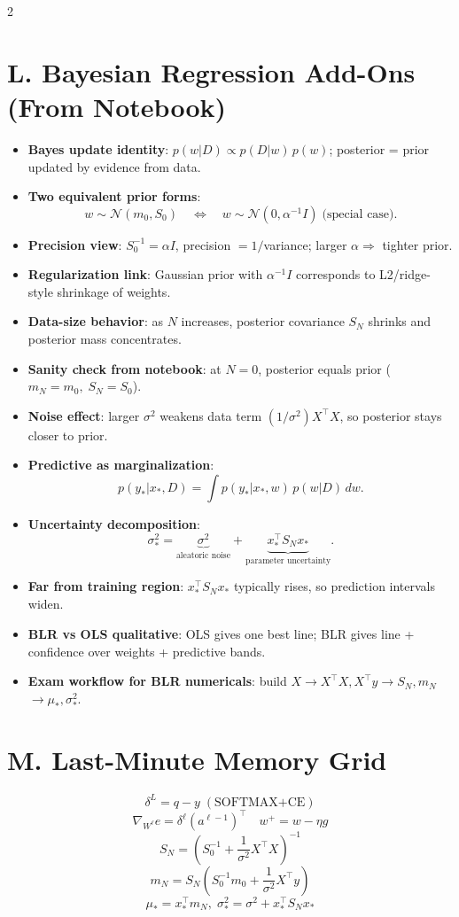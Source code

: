 \documentclass[10pt,fleqn]{article}
\begin{document}
\begin{multicols}{2}
\section*{L. Bayesian Regression Add-Ons (From Notebook)}
\begin{itemize}
  \item \textbf{Bayes update identity}: \(p(w|D)\propto p(D|w)\,p(w)\); posterior = prior updated by evidence from data.
  \item \textbf{Two equivalent prior forms}:
  \[
  w\sim\mathcal N(m_0,S_0)
  \quad\Longleftrightarrow\quad
  w\sim\mathcal N(0,\alpha^{-1}I)\;\text{(special case)}.
  \]
  \item \textbf{Precision view}: \(S_0^{-1}=\alpha I\), precision \(=1/\)variance; larger \(\alpha\Rightarrow\) tighter prior.
  \item \textbf{Regularization link}: Gaussian prior with \(\alpha^{-1}I\) corresponds to L2/ridge-style shrinkage of weights.
  \item \textbf{Data-size behavior}: as \(N\) increases, posterior covariance \(S_N\) shrinks and posterior mass concentrates.
  \item \textbf{Sanity check from notebook}: at \(N=0\), posterior equals prior (\(m_N=m_0,\;S_N=S_0\)).
  \item \textbf{Noise effect}: larger \(\sigma^2\) weakens data term \((1/\sigma^2)X^\top X\), so posterior stays closer to prior.
  \item \textbf{Predictive as marginalization}:
  \[
  p(y_*|x_*,D)=\int p(y_*|x_*,w)\,p(w|D)\,dw.
  \]
  \item \textbf{Uncertainty decomposition}:
  \[
  \sigma_*^2=\underbrace{\sigma^2}_{\text{aleatoric noise}}
  +\underbrace{x_*^\top S_Nx_*}_{\text{parameter uncertainty}}.
  \]
  \item \textbf{Far from training region}: \(x_*^\top S_Nx_*\) typically rises, so prediction intervals widen.
  \item \textbf{BLR vs OLS qualitative}: OLS gives one best line; BLR gives line + confidence over weights + predictive bands.
  \item \textbf{Exam workflow for BLR numericals}: build \(X\)\(\rightarrow\)\(X^\top X,X^\top y\)\(\rightarrow\)\(S_N,m_N\)\(\rightarrow\)\(\mu_*,\sigma_*^2\).
\end{itemize}

\section*{M. Last-Minute Memory Grid}
\[
\boxed{\delta^L=q-y\;(\text{SOFTMAX+CE})}
\]
\[
\boxed{\nabla_{W^\ell}e=\delta^\ell(a^{\ell-1})^\top}\quad
\boxed{w^+=w-\eta g}
\]
\[
\boxed{S_N=\left(S_0^{-1}+\frac1{\sigma^2}X^\top X\right)^{-1}}
\]
\[
\boxed{m_N=S_N\left(S_0^{-1}m_0+\frac1{\sigma^2}X^\top y\right)}
\]
\[
\boxed{\mu_*=x_*^\top m_N,\;\sigma_*^2=\sigma^2+x_*^\top S_Nx_*}
\]

\end{multicols}
\end{document}
